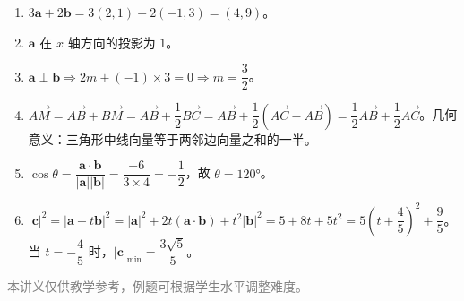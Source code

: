 \documentclass[12pt, a4paper]{ctexart}
\begin{document}
\begin{knowledgebox}[参考答案]
\begin{enumerate}[leftmargin=2em]
  \item $3\boldsymbol{a}+2\boldsymbol{b}=3(2,1)+2(-1,3)=(4,9)$。

  \item $\boldsymbol{a}$ 在 $x$ 轴方向的投影为 $1$。

  \item $\boldsymbol{a}\perp\boldsymbol{b}\Rightarrow 2m+(-1)\times3=0\Rightarrow m=\dfrac{3}{2}$。

  \item $\overrightarrow{AM}=\overrightarrow{AB}+\overrightarrow{BM}=\overrightarrow{AB}+\dfrac{1}{2}\overrightarrow{BC}=\overrightarrow{AB}+\dfrac{1}{2}(\overrightarrow{AC}-\overrightarrow{AB})=\dfrac{1}{2}\overrightarrow{AB}+\dfrac{1}{2}\overrightarrow{AC}$。几何意义：三角形中线向量等于两邻边向量之和的一半。

  \item $\cos\theta=\dfrac{\boldsymbol{a}\cdot\boldsymbol{b}}{|\boldsymbol{a}||\boldsymbol{b}|}=\dfrac{-6}{3\times4}=-\dfrac{1}{2}$，故 $\theta=120°$。

  \item $|\boldsymbol{c}|^2=|\boldsymbol{a}+t\boldsymbol{b}|^2=|\boldsymbol{a}|^2+2t(\boldsymbol{a}\cdot\boldsymbol{b})+t^2|\boldsymbol{b}|^2=5+8t+5t^2=5\!\left(t+\dfrac{4}{5}\right)^2+\dfrac{9}{5}$。当 $t=-\dfrac{4}{5}$ 时，$|\boldsymbol{c}|_{\min}=\dfrac{3\sqrt{5}}{5}$。
\end{enumerate}
\end{knowledgebox}

\vfill
\begin{center}
\small\textcolor{gray}{本讲义仅供教学参考，例题可根据学生水平调整难度。}
\end{center}
\end{document}
